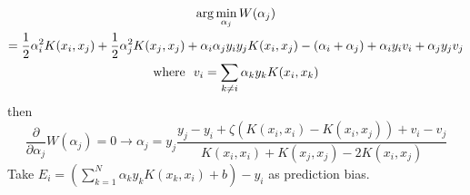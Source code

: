 \documentclass[12pt]{article}
\begin{document}
\begin{gather}
    \arg \min_{\alpha_j} W(\alpha_j) \notag \\= \frac{1}{2}\alpha_i^2K(x_i, x_j) + \frac{1}{2}\alpha_j^2K(x_j, x_j) + \alpha_i\alpha_jy_iy_jK(x_i, x_j)-(\alpha_i+\alpha_j) + \alpha_iy_iv_i+\alpha_jy_jv_j \\
    \text{where}~~v_i = \sum_{k\neq i} \alpha_k y_k K(x_i, x_k)
\end{gather}
then
\begin{equation}
    \frac{\partial}{\partial \alpha_j}W(\alpha_j) = 0 \rightarrow \alpha_j = y_j \frac{y_j - y_i + \zeta(K(x_i, x_i) - K(x_i, x_j))+v_i - v_j}{K(x_i,x_i) + K(x_j, x_j) - 2K(x_i, x_j)}
\end{equation}
Take $E_i = (
    \sum_{k=1}^N \alpha_k y_k K(x_k, x_i) + b
) - y_i$ as prediction bias.
\end{document}
